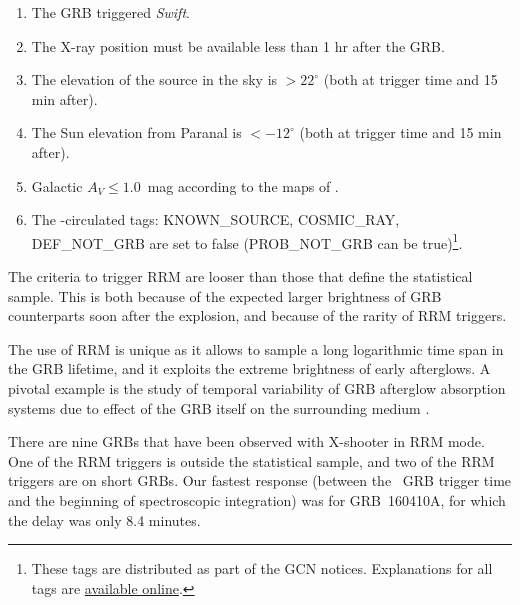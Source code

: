 \documentclass[longauth]{aa}    %
\begin{document}
\begin{enumerate}
	\item The GRB triggered \textit{Swift}.
	\item The X-ray position must be available less than 1 hr after the GRB.
	\item The elevation of the source in the sky is $> 22^\circ$ (both at trigger time and 15 min after).
	\item The Sun elevation from Paranal is $< -12^\circ$ (both at trigger time and 15 min after).
	\item Galactic $A_V \leq 1.0$~mag according to the maps of \citet{Schlegel1998}.
	\item The \swift-circulated tags: KNOWN\_SOURCE, COSMIC\_RAY, DEF\_NOT\_GRB are set to false (PROB\_NOT\_GRB can be true)\footnote{These tags are distributed as part of the GCN notices. Explanations for all tags are \href{https://gcn.gsfc.nasa.gov/sock_pkt_def_doc.html}{available online}.}.
\end{enumerate}

The criteria to trigger RRM are looser than those that define the statistical
sample. This is both because of the expected larger brightness of GRB
counterparts soon after the explosion, and because of the rarity of RRM
triggers.

The use of RRM is unique as it allows to sample a long logarithmic time span in
the GRB lifetime, and it exploits the extreme brightness of early afterglows. A
pivotal example is the study of temporal variability of GRB afterglow absorption
systems due to effect of the GRB itself on the surrounding medium \citep[e.g.,
see][]{Dessauges-Zavadsky2006, Vreeswijk2007, DElia2009, Vreeswijk2013}.

There are nine GRBs that have been observed with X-shooter in RRM mode. One of
the RRM triggers is outside the statistical sample, and two of the RRM triggers
are on short GRBs. Our fastest response (between the \swift~GRB trigger time and
the beginning of spectroscopic integration) was for GRB~160410A, for which the
delay was only 8.4 minutes.
\end{document}
